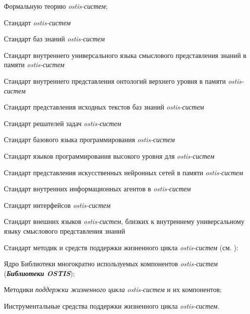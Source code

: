 \begin{textitemize}
	\item Формальную теорию \textit{ostis-систем};
	\item Стандарт \textit{ostis-систем}
	\begin{textitemize}  
		\item Стандарт баз знаний \textit{ostis-систем}
		\begin{textitemize}  
			\item Стандарт внутреннего универсального языка смыслового представления знаний в памяти \textit{ostis-систем}
			\item Стандарт внутреннего представления онтологий верхнего уровня в памяти \textit{ostis-систем}
			\item Стандарт представления исходных текстов баз знаний \textit{ostis-систем}
		\end{textitemize}  
		
		\item Стандарт решателей задач \textit{ostis-систем}
		\begin{textitemize}  
			\item Стандарт базового языка программирования \textit{ostis-систем}
			\item Стандарт языков программирования высокого уровня для \textit{ostis-систем}
			\item Стандарт представления искусственных нейронных сетей в памяти \textit{ostis-систем}
			\item Стандарт внутренних информационных агентов в \textit{ostis-систем}
		\end{textitemize}  
		
		\item Стандарт интерфейсов \textit{ostis-систем}
		\begin{textitemize}  
			\item Стандарт внешних языков \textit{ostis-систем}, близких к внутреннему универсальному языку смыслового представления знаний
		\end{textitemize}  
	\end{textitemize}
	\item Стандарт методик и средств поддержки жизненного цикла \textit{ostis-систем} (см. ):
	\begin{textitemize}
		\item Ядро Библиотеки многократно используемых компонентов \textit{ostis-систем} (\textbf{\textit{Библиотеки OSTIS}});
		\item Методики \textit{поддержки жизненного цикла} \textit{ostis-систем} и их компонентов;
		\item Инструментальные средства поддержки жизненного цикла \textit{ostis-систем}.
	\end{textitemize}
\end{textitemize}

